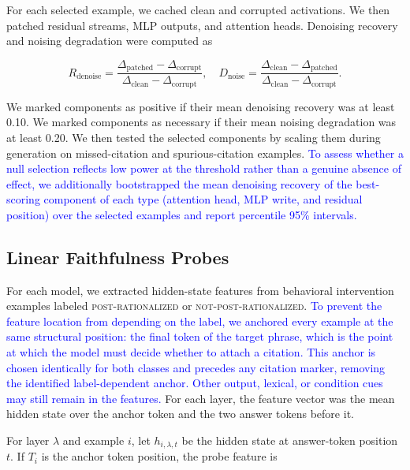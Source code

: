 \documentclass[a4paper,fleqn]{cas-sc}
\begin{document}
For each selected example, we cached clean and corrupted activations. We then patched residual streams, MLP outputs, and attention heads. Denoising recovery and noising degradation were computed as

\begin{equation}
    R_{\mathrm{denoise}} = \frac{\Delta_{\mathrm{patched}} - \Delta_{\mathrm{corrupt}}}{\Delta_{\mathrm{clean}} - \Delta_{\mathrm{corrupt}}},
    \quad
    D_{\mathrm{noise}} = \frac{\Delta_{\mathrm{clean}} - \Delta_{\mathrm{patched}}}{\Delta_{\mathrm{clean}} - \Delta_{\mathrm{corrupt}}}.
\end{equation}

We marked components as positive if their mean denoising recovery was at least 0.10. We marked components as necessary if their mean noising degradation was at least 0.20. We then tested the selected components by scaling them during generation on missed-citation and spurious-citation examples. \textcolor{blue}{To assess whether a null selection reflects low power at the threshold rather than a genuine absence of effect, we additionally bootstrapped the mean denoising recovery of the best-scoring component of each type (attention head, MLP write, and residual position) over the selected examples and report percentile 95\% intervals.}

\subsection{Linear Faithfulness Probes}

For each model, we extracted hidden-state features from behavioral intervention examples labeled \textsc{post-rationalized} or \textsc{not-post-rationalized}. \textcolor{blue}{To prevent the feature location from depending on the label, we anchored every example at the same structural position: the final token of the target phrase, which is the point at which the model must decide whether to attach a citation. This anchor is chosen identically for both classes and precedes any citation marker, removing the identified label-dependent anchor. Other output, lexical, or condition cues may still remain in the features.} For each layer, the feature vector was the mean hidden state over the anchor token and the two answer tokens before it.

For layer $\lambda$ and example $i$, let $h_{i,\lambda,t}$ be the hidden state at answer-token position $t$. If $T_i$ is the anchor token position, the probe feature is
\end{document}
